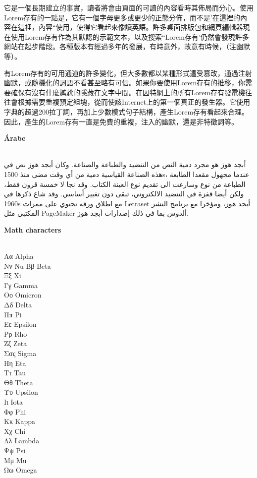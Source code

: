 \documentclass[UTF8,nofonts]{ctexart}
\begin{document}
它是一個長期建立的事實，讀者將會由頁面的可讀的內容看時其佈局而分心。使用Lorem存有的一點是，它有一個字母更多或更少的正態分佈，而不是'在這裡的內容在這裡，內容“使用，使得它看起來像讀英語。許多桌面排版包和網頁編輯器現在使用Lorem存有作為其默認的示範文本，以及搜索“Lorem存有'仍然會發現許多網站在起步階段。各種版本有經過多年的發展，有時意外，故意有時候，（注幽默等）。

有Lorem存有的可用通道的許多變化，但大多數都以某種形式遭受篡改，通過注射幽默，或隨機化的詞語不看甚至略有可信。如果你要使用Lorem存有的推移，你需要確保有沒有什麼尷尬的隱藏在文字中間。在因特網上的所有Lorem存有發電機往往會根據需要重複預定組塊，從而使該Internet上的第一個真正的發生器。它使用字典的超過200拉丁詞，再加上少數模式句子結構，產生Lorem存有看起來合理。因此，產生的Lorem存有一直是免費的重複，注入的幽默，還是非特徵詞等。\\

\par
\textbf{\huge{}Árabe}\\\\

\par
أبجد هوز هو مجرد دمية النص من التنضيد والطباعة والصناعة. وكان أبجد هوز نص في هذه الصناعة القياسية دمية من أي وقت مضى منذ 1500s، عندما مجهول مقعدا الطابعة الطباعة من نوع وسارعت الى تقديم نوع العينة الكتاب. وقد نجا لا خمسة قرون فقط، ولكن أيضا قفزة في التنضيد الالكتروني، تبقى دون تغيير أساسي. وقد شاع ذكرها في 1960s مع اطلاق ورقة تحتوي على ممرات Letraset أبجد هوز، ومؤخرا مع برنامج النشر المكتبي مثل PageMaker ألدوس بما في ذلك إصدارات أبجد هوز.\\

\par
\textbf{\huge{}Math characters}\\\\

\par
Αα	Alpha\\	Νν	Nu 
Ββ	Beta\\	Ξξ	Xi\\
Γγ	Gamma\\	Οο	Omicron\\
Δδ	Delta\\	Ππ	Pi\\
Εε	Epsilon\\	Ρρ	Rho\\
Ζζ	Zeta\\	Σσς	Sigma\\
Ηη	Eta\\	Ττ	Tau\\
Θθ	Theta\\	Υυ	Upsilon\\
Ιι	Iota\\	Φφ	Phi\\
Κκ	Kappa\\	Χχ	Chi\\
Λλ	Lambda\\	Ψψ	Psi\\
Μμ	Mu\\	Ωω	Omega\\
\end{document}
